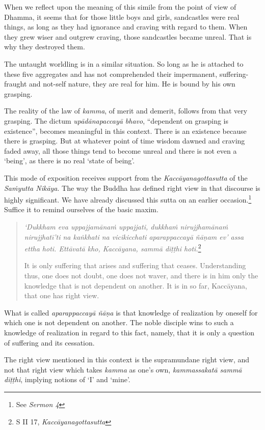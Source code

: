 When we reflect upon the meaning of this simile from the point of view of Dhamma, it seems that for those little boys and girls, sandcastles were real things, as long as they had ignorance and craving with regard to them. When they grew wiser and outgrew craving, those sandcastles became unreal. That is why they destroyed them.

The untaught worldling is in a similar situation. So long as he is attached to these five aggregates and has not comprehended their impermanent, suffering-fraught and not-self nature, they are real for him. He is bound by his own grasping.

The reality of the law of \emph{kamma}, of merit and demerit, follows from that very grasping. The dictum \emph{upādānapaccayā bhavo}, ``dependent on grasping is existence'', becomes meaningful in this context. There is an existence because there is grasping. But at whatever point of time wisdom dawned and craving faded away, all those things tend to become unreal and there is not even a `being', as there is no real `state of being'.

This mode of exposition receives support from the \emph{Kaccāyanagottasutta} of the \emph{Saṁyutta Nikāya}. The way the Buddha has defined right view in that discourse is highly significant. We have already discussed this sutta on an earlier occasion.\footnote{See \emph{Sermon 4}} Suffice it to remind ourselves of the basic maxim.

\begin{quote}
\emph{`Dukkham eva uppajjamānaṁ uppajjati, dukkhaṁ nirujjhamānaṁ nirujjhatī'ti na kaṅkhati na vicikicchati aparappaccayā ñāṇam ev' assa ettha hoti. Ettāvatā kho, Kaccāyana, sammā diṭṭhi hoti.}\footnote{S II 17, \emph{Kaccāyanagottasutta}}

It is only suffering that arises and suffering that ceases. Understanding thus, one does not doubt, one does not waver, and there is in him only the knowledge that is not dependent on another. It is in so far, Kaccāyana, that one has right view.
\end{quote}

What is called \emph{aparappaccayā ñāṇa} is that knowledge of realization by oneself for which one is not dependent on another. The noble disciple wins to such a knowledge of realization in regard to this fact, namely, that it is only a question of suffering and its cessation.

The right view mentioned in this context is the supramundane right view, and not that right view which takes \emph{kamma} as one's own, \emph{kammassakatā sammā diṭṭhi}, implying notions of `I' and `mine'.

